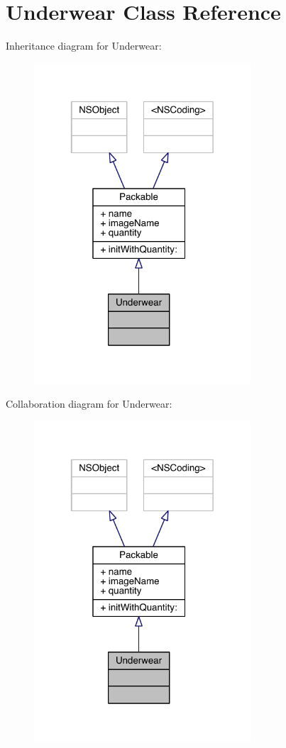 \hypertarget{interface_underwear}{\section{Underwear Class Reference}
\label{interface_underwear}
}


Inheritance diagram for Underwear\-:\nopagebreak
\begin{figure}[H]
\begin{center}
\leavevmode
\includegraphics[width=229pt]{interface_underwear__inherit__graph}
\end{center}
\end{figure}


Collaboration diagram for Underwear\-:\nopagebreak
\begin{figure}[H]
\begin{center}
\leavevmode
\includegraphics[width=229pt]{interface_underwear__coll__graph}
\end{center}
\end{figure}
